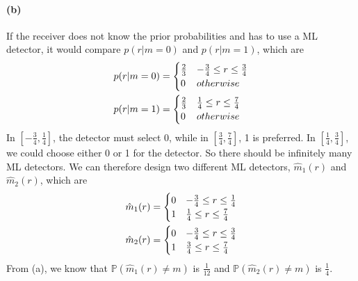 \documentclass{article}
\begin{document}
\paragraph{(b)}
If the receiver does not know the prior probabilities and has to use a ML detector, it would compare $p(r|m=0)$ and $p(r|m=1)$, which are
\begin{align}
	p(r|m=0)&=\begin{cases}
		\frac{2}{3} & -\frac{3}{4}\le r\le \frac{3}{4}\\
		0 & otherwise
	\end{cases}\notag \\
	p(r|m=1)&=\begin{cases}
		\frac{2}{3} & \frac{1}{4}\le r\le \frac{7}{4}\\
		0 & otherwise
	\end{cases}\notag
\end{align}
In $[-\frac{3}{4},\frac{1}{4}]$, the detector must select 0, while in $[\frac{3}{4},\frac{7}{4}]$, 1 is preferred. In $[\frac{1}{4},\frac{3}{4}]$, we could choose either 0 or 1 for the detector. So there should be infinitely many ML detectors. We can therefore design two different ML detectors, $\hat{m}_1(r)$ and $\hat{m}_2(r)$, which are
\begin{align}
	\hat{m}_1(r)&=\begin{cases}
		0 & -\frac{3}{4}\le r\le \frac{1}{4}\\
		1 & \frac{1}{4}\le r\le \frac{7}{4}
	\end{cases}\notag \\
	\hat{m}_2(r)&=\begin{cases}
		0 & -\frac{3}{4}\le r\le \frac{3}{4}\\
		1 & \frac{3}{4}\le r\le \frac{7}{4}
	\end{cases}\notag
\end{align}
From (a), we know that $\mathbb{P}(\hat{m}_1(r)\neq m)$ is $\frac{1}{12}$ and $\mathbb{P}(\hat{m}_2(r)\neq m)$ is $\frac{1}{4}$.
\end{document}
